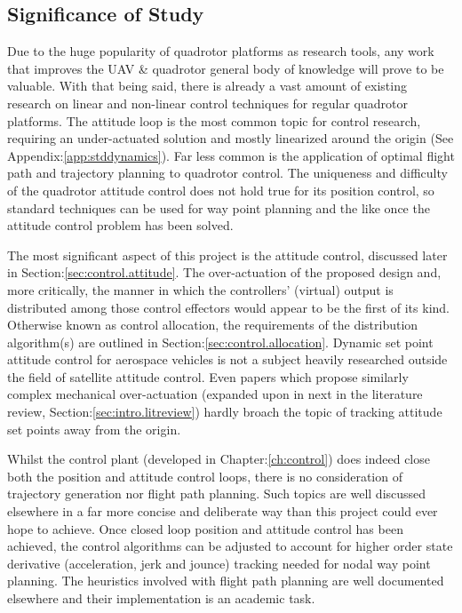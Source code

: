 \subsection{Significance of Study}
\label{subsec:intro.foreword.significance}
Due to the huge popularity of quadrotor platforms as research tools, any work that improves the UAV \& quadrotor general body of knowledge will prove to be valuable. With that being said, there is already a vast amount of existing research on linear and non-linear control techniques for regular quadrotor platforms. The attitude loop is the most common topic for control research, requiring an under-actuated solution and mostly linearized around the origin (See Appendix:\ref{app:stddynamics}). Far less common is the application of optimal flight path and trajectory planning to quadrotor control. The uniqueness and difficulty of the quadrotor attitude control does not hold true for its position control, so standard techniques can be used for way point planning and the like once the attitude control problem has been solved.
\par
The most significant aspect of this project is the attitude control, discussed later in Section:\ref{sec:control.attitude}. The over-actuation of the proposed design and, more critically, the manner in which the controllers' (virtual) output is distributed among those control effectors would appear to be the first of its kind. Otherwise known as control allocation, the requirements of the distribution algorithm(s) are outlined in Section:\ref{sec:control.allocation}. Dynamic set point attitude control for aerospace vehicles is not a subject heavily researched outside the field of satellite attitude control. Even papers which propose similarly complex mechanical over-actuation (expanded upon in next in the literature review, Section:\ref{sec:intro.litreview}) hardly broach the topic of tracking attitude set points away from the origin.
\par
Whilst the control plant (developed in Chapter:\ref{ch:control}) does indeed close both the position and attitude control loops, there is no consideration of trajectory generation nor flight path planning. Such topics are well discussed elsewhere in a far more concise and deliberate way than this project could ever hope to achieve. Once closed loop position and attitude control has been achieved, the control algorithms can be adjusted to account for higher order state derivative (acceleration, jerk and jounce) tracking needed for nodal way point planning. The heuristics involved with flight path planning are well documented elsewhere and their implementation is an academic task.
